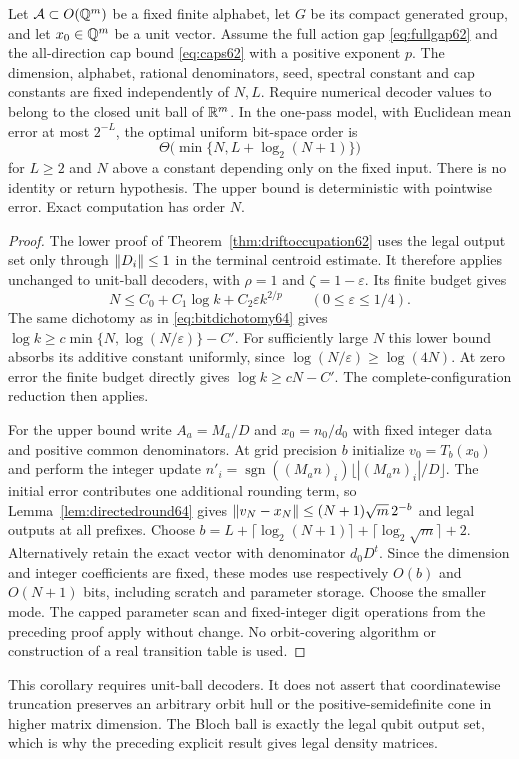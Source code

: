 \begin{corollary}\label{cor:rationalspace64}
Let $\mathcal A\subset O(\mathbb Q^m)$ be a fixed finite alphabet, let $G$
be its compact generated group, and let $x_0\in\mathbb Q^m$ be a unit vector.
Assume the full action gap \eqref{eq:fullgap62} and the all-direction
cap bound \eqref{eq:caps62} with a positive exponent $p$.
The dimension, alphabet, rational denominators, seed, spectral constant
and cap constants are fixed independently of $N,L$.
Require numerical decoder values to belong to the closed unit ball
of $\mathbb R^m$. In the one-pass model, with Euclidean mean error at most
$2^{-L}$, the optimal uniform bit-space order is
\[
             \Theta\bigl(\min\{N,L+\log_2(N+1)\}\bigr)
\]
for $L\ge2$ and $N$ above a constant depending only on the fixed
input. There is no identity or return hypothesis. The upper bound is
deterministic with pointwise error. Exact computation has order $N$.
\end{corollary}
\begin{proof}
The lower proof of Theorem~\ref{thm:driftoccupation62} uses the legal
output set only through $\lVert D_i\rVert\le1$ in the terminal centroid
estimate. It therefore applies unchanged to unit-ball decoders, with
$\rho=1$ and $\zeta=1-\varepsilon$. Its finite budget gives
\[
 N\le C_0+C_1\log k+C_2\varepsilon k^{2/p}
                   \qquad(0\le\varepsilon\le1/4).
\]
The same dichotomy as in \eqref{eq:bitdichotomy64} gives
$\log k\ge c\min\{N,\log(N/\varepsilon)\}-C'$.
For sufficiently large $N$ this lower bound absorbs its additive
constant uniformly, since $\log(N/\varepsilon)\ge\log(4N)$.
At zero error the finite budget directly gives $\log k\ge cN-C'$.
The complete-configuration reduction then applies.

For the upper bound write $A_a=M_a/D$ and $x_0=n_0/d_0$ with fixed
integer data and positive common denominators. At grid precision $b$
initialize $v_0=T_b(x_0)$ and perform the integer update
$n'_i=\operatorname{sgn}((M_an)_i)\lfloor |(M_an)_i|/D\rfloor$.
The initial error contributes one additional rounding term, so
Lemma~\ref{lem:directedround64} gives
$\lVert v_N-x_N\rVert\le(N+1)\sqrt m\,2^{-b}$ and legal outputs at
all prefixes. Choose
$b=L+\lceil\log_2(N+1)\rceil+\lceil\log_2\sqrt m\rceil+2$.
Alternatively retain the exact vector with denominator $d_0D^t$.
Since the dimension and integer coefficients are fixed, these modes
use respectively $O(b)$ and $O(N+1)$ bits, including scratch and
parameter storage. Choose the smaller mode. The capped parameter
scan and fixed-integer digit operations from the preceding proof
apply without change. No orbit-covering algorithm or construction of
a real transition table is used.
\end{proof}
This corollary requires unit-ball decoders. It does not assert that
coordinatewise truncation preserves an arbitrary orbit hull or the
positive-semidefinite cone in higher matrix dimension. The Bloch ball
is exactly the legal qubit output set, which is why the preceding
explicit result gives legal density matrices.

